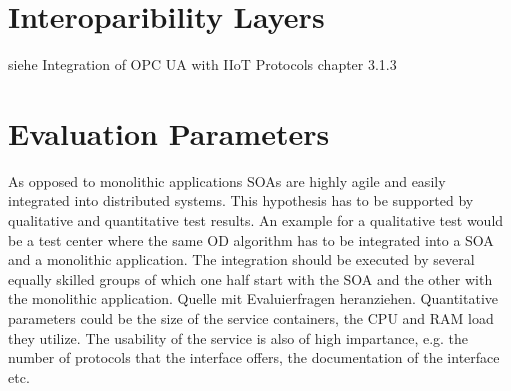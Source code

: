\section{Interoparibility Layers}
siehe Integration of OPC UA with IIoT Protocols chapter 3.1.3

\section{Evaluation Parameters}
As opposed to monolithic applications SOAs are highly agile and easily integrated into distributed systems. This hypothesis has to be supported by qualitative and quantitative test results. An example for a qualitative test would be a test center where the same OD algorithm has to be integrated into a SOA and a monolithic application. The integration should be executed by several equally skilled groups of which one half start with the SOA and the other with the monolithic application. 
Quelle mit Evaluierfragen heranziehen.
Quantitative parameters could be the size of the service containers, the CPU and RAM load they utilize. The usability of the service is also of high impartance, e.g. the number of protocols that the interface offers, the documentation of the interface etc. 

